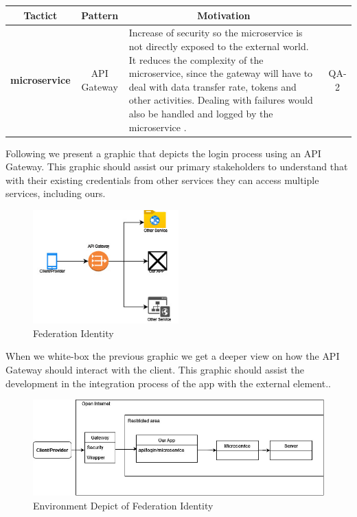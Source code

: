 \begin{table}[H]
    \begin{tabularx}{\textwidth}{|c|c|X|c|}
        \toprule
        \multicolumn{1}{c}{Tactict} & \multicolumn{1}{c}{Pattern} & \multicolumn{1}{c}{Motivation} \\
        \midrule
        \textbf{\Gls{microservice}} & \gls{API Gateway} & Increase of security so the microservice is not directly
        exposed to the external world. It reduces the complexity of the microservice, since the gateway will have to deal
        with data transfer rate, tokens and other activities. Dealing with failures would also be handled and logged
        by the microservice \cite{refonline:javtop}. & QA-2\\
        \bottomrule
    \end{tabularx}
\end{table}

Following we present a graphic that depicts the login process using an \gls{API Gateway}. This graphic should assist
our primary stakeholders to understand that with their existing credentials from other services they can access multiple 
services, including ours.

\begin{figure}[H]
    \centering
    \includegraphics[width=0.5\textwidth]{assets/simple_api_gateway.jpg}
    \caption{Federation Identity}
    \label{fig:simple_api_gateway}
\end{figure}

When we white-box the previous graphic we get a deeper view on how the \gls{API Gateway} should interact with the 
\gls{client}. This graphic should assist the development in the integration process of the app with the external element..

\begin{figure}[H]
    \centering
    \includegraphics[width=1\textwidth]{assets/complex_api_gateway.jpg}
    \caption{Environment Depict of Federation Identity}
    \label{fig:complex_api_gateway}
\end{figure}

